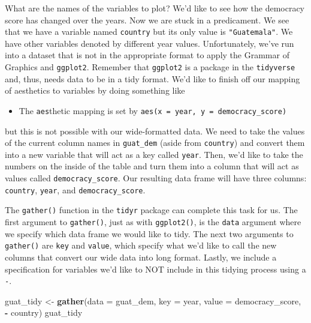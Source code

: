 \documentclass[12pt,]{krantz}
\makeatletter
\newenvironment{Shaded}{\begin{snugshade}}{\end{snugshade}}
\newcommand{\KeywordTok}[1]{\textcolor[rgb]{0.27,0.27,0.27}{\textbf{#1}}}
\newcommand{\DataTypeTok}[1]{\textcolor[rgb]{0.27,0.27,0.27}{#1}}
\newcommand{\StringTok}[1]{\textcolor[rgb]{0.5,0.5,0.5}{#1}}
\newcommand{\OperatorTok}[1]{\textcolor[rgb]{0.43,0.43,0.43}{\textbf{#1}}}
\newcommand{\NormalTok}[1]{#1}
\providecommand{\tightlist}{%
  \setlength{\itemsep}{0pt}\setlength{\parskip}{0pt}}
\newenvironment{kframe}{%
\medskip{}
\setlength{\fboxsep}{.8em}
 \def\at@end@of@kframe{}%
 \ifinner\ifhmode%
  \def\at@end@of@kframe{\end{minipage}}%
  \begin{minipage}{\columnwidth}%
 \fi\fi%
 \def\FrameCommand##1{\hskip\@totalleftmargin \hskip-\fboxsep
 \colorbox{shadecolor}{##1}\hskip-\fboxsep
     \hskip-\linewidth \hskip-\@totalleftmargin \hskip\columnwidth}%
 \MakeFramed {\advance\hsize-\width
   \@totalleftmargin\z@ \linewidth\hsize
   \@setminipage}}%
 {\par\unskip\endMakeFramed%
 \at@end@of@kframe}
\renewenvironment{Shaded}{\begin{kframe}}{\end{kframe}}
\makeatother
\begin{document}
What are the names of the variables to plot? We'd like to see how the
democracy score has changed over the years. Now we are stuck in a
predicament. We see that we have a variable named \texttt{country} but
its only value is \texttt{"Guatemala"}. We have other variables denoted
by different year values. Unfortunately, we've run into a dataset that
is not in the appropriate format to apply the Grammar of Graphics and
\texttt{ggplot2}. Remember that \texttt{ggplot2} is a package in the
\texttt{tidyverse} and, thus, needs data to be in a tidy format. We'd
like to finish off our mapping of aesthetics to variables by doing
something like

\begin{itemize}
\tightlist
\item
  The \texttt{aes}thetic mapping is set by
  \texttt{aes(x\ =\ year,\ y\ =\ democracy\_score)}
\end{itemize}

but this is not possible with our wide-formatted data. We need to take
the values of the current column names in \texttt{guat\_dem} (aside from
\texttt{country}) and convert them into a new variable that will act as
a key called \texttt{year}. Then, we'd like to take the numbers on the
inside of the table and turn them into a column that will act as values
called \texttt{democracy\_score}. Our resulting data frame will have
three columns: \texttt{country}, \texttt{year}, and
\texttt{democracy\_score}.

The \texttt{gather()} function in the \texttt{tidyr} package can
complete this task for us. The first argument to \texttt{gather()}, just
as with \texttt{ggplot2()}, is the \texttt{data} argument where we
specify which data frame we would like to tidy. The next two arguments
to \texttt{gather()} are \texttt{key} and \texttt{value}, which specify
what we'd like to call the new columns that convert our wide data into
long format. Lastly, we include a specification for variables we'd like
to NOT include in this tidying process using a \texttt{-}.

\begin{Shaded}
\begin{Highlighting}[]
\NormalTok{guat_tidy <-}\StringTok{ }\KeywordTok{gather}\NormalTok{(}\DataTypeTok{data =}\NormalTok{ guat_dem, }
                    \DataTypeTok{key =}\NormalTok{ year,}
                    \DataTypeTok{value =}\NormalTok{ democracy_score,}
                    \OperatorTok{-}\StringTok{ }\NormalTok{country) }
\NormalTok{guat_tidy}
\end{Highlighting}
\end{Shaded}
\end{document}
